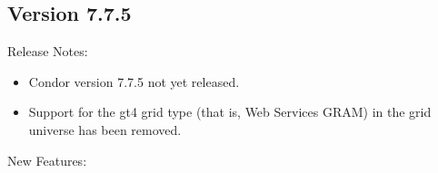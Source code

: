 \subsection*{\label{sec:New-7-7-5}Version 7.7.5}

\noindent Release Notes:

\begin{itemize}

\item Condor version 7.7.5 not yet released.

\item Support for the gt4 grid type (that is, Web Services GRAM) in the grid
universe has been removed.

\end{itemize}


\noindent New Features:

